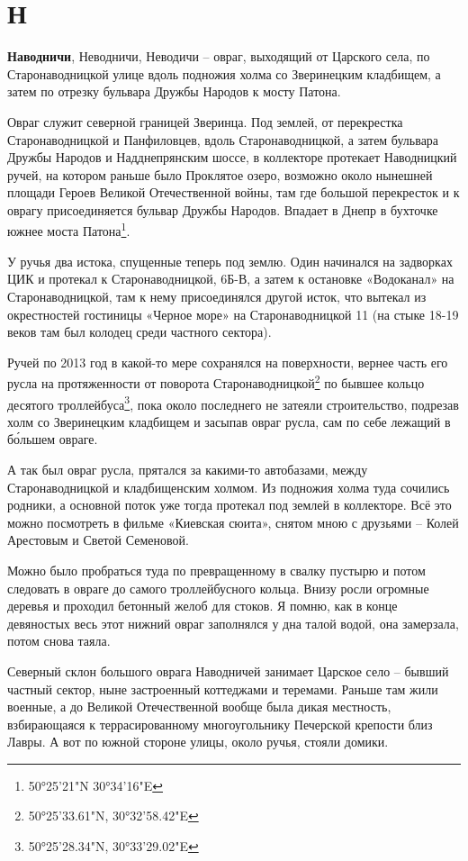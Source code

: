 \chapter*{Н}

\textbf{Наводничи}, Неводничи, Неводичи – овраг, выходящий от Царского села, по Старонаводницкой улице вдоль подножия холма со Зверинецким кладбищем, а затем по отрезку бульвара Дружбы Народов к мосту Патона. 

Овраг служит северной границей Зверинца. Под землей, от перекрестка Старонаводницкой и Панфиловцев, вдоль Старонаводницкой, а затем бульвара Дружбы Народов и Надднепрянским шоссе, в коллекторе протекает Наводницкий ручей, на котором раньше было Проклятое озеро, возможно около нынешней площади Героев Великой Отечественной войны, там где большой перекресток и к оврагу присоединяется бульвар Дружбы Народов. Впадает в Днепр в бухточке южнее моста Патона\footnote{50°25'21"N 30°34'16"E}.

У ручья два истока, спущенные теперь под землю. Один начинался на задворках ЦИК и протекал к Старонаводницкой, 6Б-В, а затем к остановке «Водоканал» на Старонаводницкой, там к нему присоединялся другой исток, что вытекал из окрестностей гостиницы «Черное море» на Старонаводницкой 11 (на стыке 18-19 веков там был колодец среди частного сектора).

Ручей по 2013 год в какой-то мере сохранялся на поверхности, вернее часть его русла на протяженности от поворота Старонаводницкой\footnote{50°25'33.61"N, 30°32'58.42"E} по бывшее кольцо десятого троллейбуса\footnote{ 50°25'28.34"N, 30°33'29.02"E}, пока около последнего не затеяли строительство, подрезав холм со Зверинецким кладбищем и засыпав овраг русла, сам по себе лежащий в б\'ольшем овраге. 

А так был овраг русла, прятался за какими-то автобазами, между Старонаводницкой и кладбищенским холмом. Из подножия холма туда сочились родники, а основной поток уже тогда протекал под землей в коллекторе. Всё это можно посмотреть в фильме «Киевская сюита», снятом мною с друзьями – Колей Арестовым и Светой Семеновой.

Можно было пробраться туда по превращенному в свалку пустырю и потом следовать в овраге до самого троллейбусного кольца. Внизу росли огромные деревья и проходил бетонный желоб для стоков. Я помню, как в конце девяностых весь этот нижний овраг заполнялся у дна талой водой, она замерзала, потом снова таяла.

Северный склон большого оврага Наводничей занимает Царское село – бывший частный сектор, ныне застроенный коттеджами и теремами. Раньше там жили военные, а до Великой Отечественной вообще была дикая местность, взбирающаяся к террасированному многоугольнику Печерской крепости близ Лавры. А вот по южной стороне улицы, около ручья, стояли домики.

